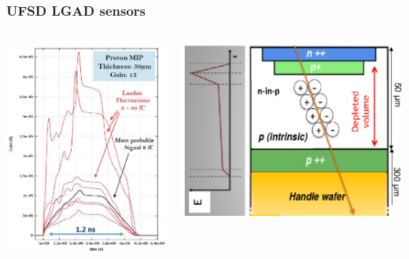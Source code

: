 \documentclass[aspectratio=169]{beamer}
\begin{document}
	
	\begin{frame}
	\frametitle{UFSD LGAD sensors}
	\begin{columns}
		\begin{center}	
			\includegraphics[width=0.9 \textwidth]{IMG/LGAD_Signal.PNG}
		\end{center}
	\begin{columns}
			\begin{center}
				\includegraphics[width=1 \textwidth]{IMG/UFSDLGAD.PNG}

\end{center}
\end{columns}
\end{columns}
\end{frame}
\end{document}
